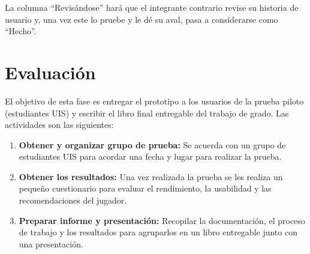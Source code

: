 La columna “Revisándose” hará que el integrante contrario revise su historia de usuario y, una vez este lo pruebe y le dé su aval, pasa a considerarse como “Hecho”.

\section{Evaluación}

El objetivo de esta fase es entregar el prototipo a los usuarios de la prueba piloto (estudiantes UIS) y escribir el libro final entregable del trabajo de grado. Las actividades son las siguientes:

\begin{enumerate}
  \item \textbf{Obtener y organizar grupo de prueba:} Se acuerda con un grupo de estudiantes UIS para acordar una fecha y lugar para realizar la prueba.
  \item \textbf{Obtener los resultados:} Una vez realizada la prueba se les realiza un pequeño cuestionario para evaluar el rendimiento, la usabilidad y las recomendaciones del jugador.
  \item \textbf{Preparar informe y presentación:} Recopilar la documentación, el proceso de trabajo y los resultados para agruparlos en un libro entregable junto con una presentación.
\end{enumerate}
